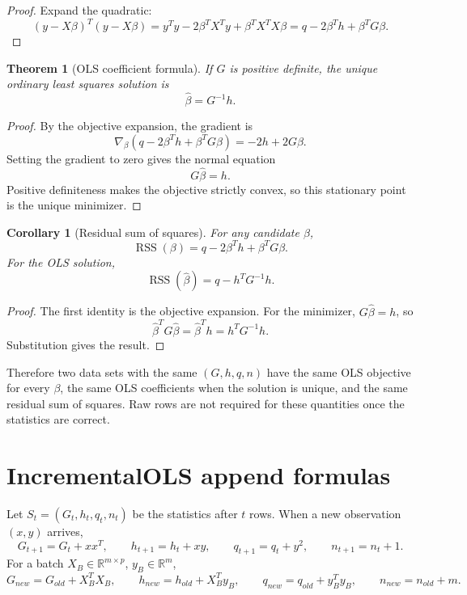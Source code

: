 \documentclass[11pt]{article}
\newtheorem{theorem}{Theorem}
\newtheorem{corollary}{Corollary}
\begin{document}
\begin{proof}
Expand the quadratic:
\[
  (y - X\beta)^T(y - X\beta)
  = y^T y - 2\beta^T X^T y + \beta^T X^T X\beta
  = q - 2\beta^T h + \beta^T G\beta .
\]
\end{proof}

\begin{theorem}[OLS coefficient formula]
If \(G\) is positive definite, the unique ordinary least squares
solution is
\[
  \widehat{\beta} = G^{-1}h .
\]
\end{theorem}

\begin{proof}
By the objective expansion, the gradient is
\[
  \nabla_\beta\left(q - 2\beta^T h + \beta^T G\beta\right)
  = -2h + 2G\beta .
\]
Setting the gradient to zero gives the normal equation
\[
  G\widehat{\beta}=h .
\]
Positive definiteness makes the objective strictly convex, so this
stationary point is the unique minimizer.
\end{proof}

\begin{corollary}[Residual sum of squares]
For any candidate \(\beta\),
\[
  \operatorname{RSS}(\beta)
  = q - 2\beta^T h + \beta^T G\beta .
\]
For the OLS solution,
\[
  \operatorname{RSS}(\widehat{\beta})
  = q - h^T G^{-1}h .
\]
\end{corollary}

\begin{proof}
The first identity is the objective expansion.  For the minimizer,
\(G\widehat{\beta}=h\), so
\[
  \widehat{\beta}^T G\widehat{\beta}
  = \widehat{\beta}^T h
  = h^T G^{-1}h .
\]
Substitution gives the result.
\end{proof}

Therefore two data sets with the same \((G,h,q,n)\) have the same OLS
objective for every \(\beta\), the same OLS coefficients when the
solution is unique, and the same residual sum of squares.  Raw rows are
not required for these quantities once the statistics are correct.

\section{IncrementalOLS append formulas}

Let \(S_t=(G_t,h_t,q_t,n_t)\) be the statistics after \(t\) rows.  When a
new observation \((x,y)\) arrives,
\[
  G_{t+1} = G_t + xx^T,\qquad
  h_{t+1} = h_t + xy,\qquad
  q_{t+1} = q_t + y^2,\qquad
  n_{t+1} = n_t + 1 .
\]
For a batch \(X_B \in \mathbb{R}^{m \times p}\), \(y_B \in
\mathbb{R}^m\),
\[
  G_{new} = G_{old} + X_B^T X_B,\qquad
  h_{new} = h_{old} + X_B^T y_B,\qquad
  q_{new} = q_{old} + y_B^T y_B,\qquad
  n_{new} = n_{old} + m .
\]
\end{document}
